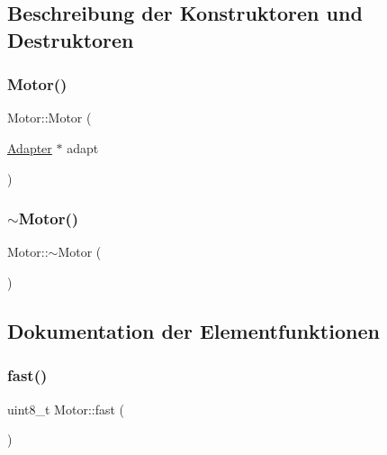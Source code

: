 \subsection{Beschreibung der Konstruktoren und Destruktoren}
\hypertarget{class_motor_a9150fc4647f7588364cb75dca1df4c96}{}\label{class_motor_a9150fc4647f7588364cb75dca1df4c96} 
\subsubsection{\texorpdfstring{Motor()}{Motor()}}
{\footnotesize\ttfamily Motor\+::\+Motor (\begin{DoxyParamCaption}\item[{\hyperlink{class_adapter}{Adapter} $\ast$}]{adapt }\end{DoxyParamCaption})}

\hypertarget{class_motor_a2e57c7b2681efea1d3b7f253ee88ecd4}{}\label{class_motor_a2e57c7b2681efea1d3b7f253ee88ecd4} 
\subsubsection{\texorpdfstring{$\sim$\+Motor()}{~Motor()}}
{\footnotesize\ttfamily Motor\+::$\sim$\+Motor (\begin{DoxyParamCaption}{ }\end{DoxyParamCaption})\hspace{0.3cm}{\ttfamily [virtual]}}



\subsection{Dokumentation der Elementfunktionen}
\hypertarget{class_motor_a09b1a5376d1ea0eb39dff2ebcc325bde}{}\label{class_motor_a09b1a5376d1ea0eb39dff2ebcc325bde} 
\subsubsection{\texorpdfstring{fast()}{fast()}}
{\footnotesize\ttfamily uint8\+\_\+t Motor\+::fast (\begin{DoxyParamCaption}{ }\end{DoxyParamCaption})}

\hypertarget{class_motor_ae8af72c3a398bb959090d0be1083f5d7}{}\label{class_motor_ae8af72c3a398bb959090d0be1083f5d7} 
